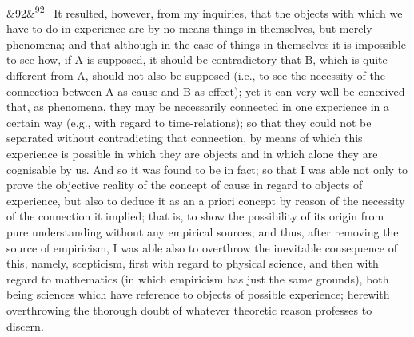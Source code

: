 \documentclass[12pt]{article}
\newcommand{\para}[1][]{\par\noindent\ifx&#1&\else\textsuperscript{\footnotesize #1}~\fi}
\begin{document}
\para[92] It resulted, however, from my inquiries, that the objects with which we have to do in experience are by no means things in themselves, but merely phenomena; and that although in the case of things in themselves it is impossible to see how, if A is supposed, it should be contradictory that B, which is quite different from A, should not also be supposed (i.e., to see the necessity of the connection between A as cause and B as effect); yet it can very well be conceived that, as phenomena, they may be necessarily connected in one experience in a certain way (e.g., with regard to time-relations); so that they could not be separated without contradicting that connection, by means of which this experience is possible in which they are objects and in which alone they are cognisable by us. And so it was found to be in fact; so that I was able not only to prove the objective reality of the concept of cause in regard to objects of experience, but also to deduce it as an a priori concept by reason of the necessity of the connection it implied; that is, to show the possibility of its origin from pure understanding without any empirical sources; and thus, after removing the source of empiricism, I was able also to overthrow the inevitable consequence of this, namely, scepticism, first with regard to physical science, and then with regard to mathematics (in which empiricism has just the same grounds), both being sciences which have reference to objects of possible experience; herewith overthrowing the thorough doubt of whatever theoretic reason professes to discern.
\end{document}
